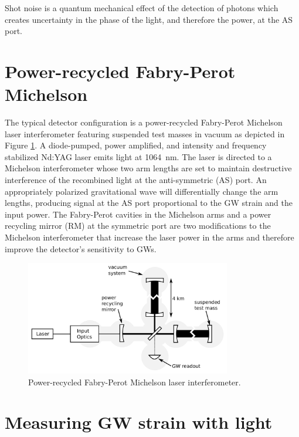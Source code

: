 Shot noise is a quantum mechanical effect of the detection
of photons which creates uncertainty in the phase of the light, and
therefore the power, at the AS port.


\section{Power-recycled Fabry-Perot Michelson}
The typical detector configuration is a power-recycled Fabry-Perot
Michelson laser interferometer featuring suspended test masses in
vacuum as depicted in Figure \ref{fig:IFOschematic}. A diode-pumped,
power amplified, and intensity and frequency stabilized Nd:YAG laser
emits light at 1064~nm. The laser is directed to a Michelson
interferometer whose two arm lengths are set to maintain destructive
interference of the recombined light at the anti-symmetric (AS)
port. An appropriately polarized gravitational wave will
differentially change the arm lengths, producing signal at the AS port
proportional to the GW strain and the input power. The Fabry-Perot
cavities in the Michelson arms and a power recycling mirror (RM) at
the symmetric port are two modifications to the Michelson
interferometer that increase the laser power in the arms and therefore
improve the detector's sensitivity to GWs.

\begin{figure}
\begin{centering}
\includegraphics[width=0.8\textwidth]{figures/IFOschematic.pdf}
\caption{Power-recycled Fabry-Perot Michelson laser interferometer.}
\label{fig:IFOschematic}
\end{centering}
\end{figure}



\section{Measuring GW strain with light}
